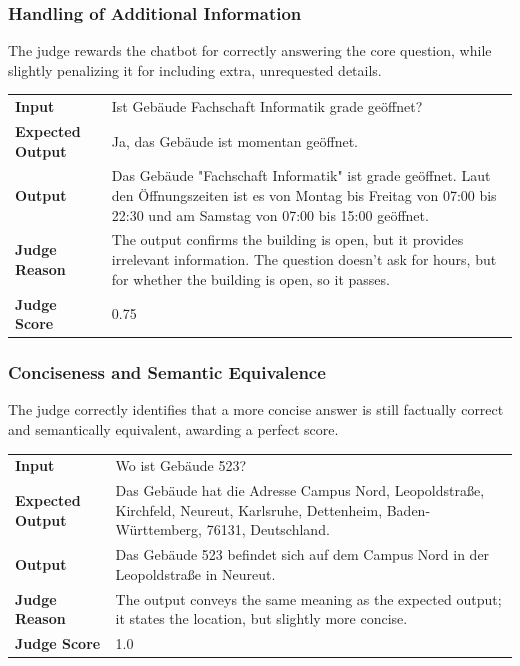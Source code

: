 \documentclass{article}
\begin{document}
\subsubsection*{Handling of Additional Information}
The judge rewards the chatbot for correctly answering the core question, while slightly penalizing it for including extra, unrequested details.\\

\begin{longtable}{p{} p{}}
\textbf{Input} & Ist Gebäude Fachschaft Informatik grade geöffnet? \\
\textbf{Expected Output} & Ja, das Gebäude ist momentan geöffnet. \\
\textbf{Output} & Das Gebäude "Fachschaft Informatik" ist grade geöffnet. Laut den Öffnungszeiten ist es von Montag bis Freitag von 07:00 bis 22:30 und am Samstag von 07:00 bis 15:00 geöffnet. \\
\textbf{Judge Reason} & The output confirms the building is open, but it provides irrelevant information. The question doesn't ask for hours, but for whether the building is open, so it passes. \\
\textbf{Judge Score} & 0.75 \\
\end{longtable}

\subsubsection*{Conciseness and Semantic Equivalence}
The judge correctly identifies that a more concise answer is still factually correct and semantically equivalent, awarding a perfect score.\\

\begin{longtable}{p{} p{}}
\textbf{Input} & Wo ist Gebäude 523? \\
\textbf{Expected Output} & Das Gebäude hat die Adresse Campus Nord, Leopoldstraße, Kirchfeld, Neureut, Karlsruhe, Dettenheim, Baden-Württemberg, 76131, Deutschland. \\
\textbf{Output} & Das Gebäude 523 befindet sich auf dem Campus Nord in der Leopoldstraße in Neureut. \\
\textbf{Judge Reason} & The output conveys the same meaning as the expected output; it states the location, but slightly more concise. \\
\textbf{Judge Score} & 1.0 \\
\end{longtable}
\end{document}

